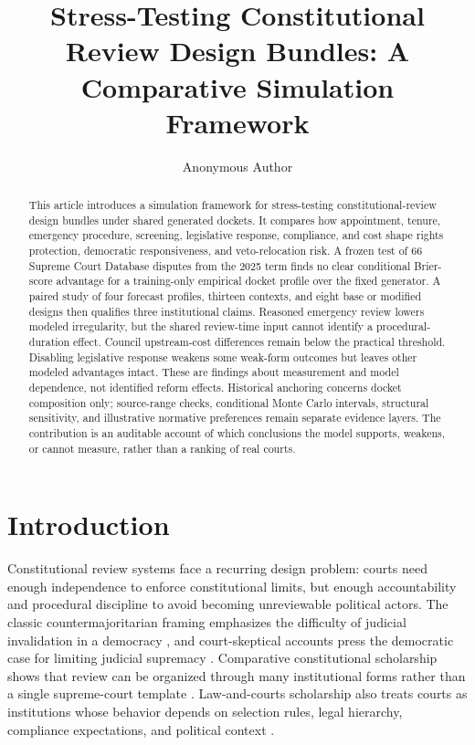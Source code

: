 \documentclass[
  journal=small,
  manuscript=research-article,
  year=2026
]{cup-journal}
\title{Stress-Testing Constitutional Review Design Bundles: A Comparative Simulation Framework}
\author{Anonymous Author}
\affiliation{Affiliation withheld for review}
\date{}
\begin{document}
\maketitle

\begin{abstract}
This article introduces a simulation framework for stress-testing constitutional-review design bundles under shared generated dockets. It compares how appointment, tenure, emergency procedure, screening, legislative response, compliance, and cost shape rights protection, democratic responsiveness, and veto-relocation risk. A frozen test of 66 Supreme Court Database disputes from the 2025 term finds no clear conditional Brier-score advantage for a training-only empirical docket profile over the fixed generator. A paired study of four forecast profiles, thirteen contexts, and eight base or modified designs then qualifies three institutional claims. Reasoned emergency review lowers modeled irregularity, but the shared review-time input cannot identify a procedural-duration effect. Council upstream-cost differences remain below the practical threshold. Disabling legislative response weakens some weak-form outcomes but leaves other modeled advantages intact. These are findings about measurement and model dependence, not identified reform effects. Historical anchoring concerns docket composition only; source-range checks, conditional Monte Carlo intervals, structural sensitivity, and illustrative normative preferences remain separate evidence layers. The contribution is an auditable account of which conclusions the model supports, weakens, or cannot measure, rather than a ranking of real courts.
\end{abstract}

\section{Introduction}

Constitutional review systems face a recurring design problem: courts need enough independence to enforce constitutional limits, but enough accountability and procedural discipline to avoid becoming unreviewable political actors. The classic countermajoritarian framing emphasizes the difficulty of judicial invalidation in a democracy \citep{bickel1962}, and court-skeptical accounts press the democratic case for limiting judicial supremacy \citep{tushnet1999}. Comparative constitutional scholarship shows that review can be organized through many institutional forms rather than a single supreme-court template \citep{stoneSweet2000,ginsburg2003}. Law-and-courts scholarship also treats courts as institutions whose behavior depends on selection rules, legal hierarchy, compliance expectations, and political context \citep{epsteinKnight1998,helmke2005,vanberg2005,staton2010}.
\end{document}
